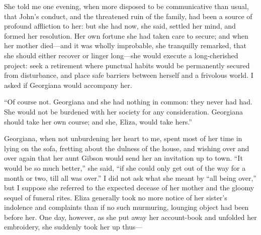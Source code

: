 She told me one evening, when more disposed to be communicative than
usual, that John's conduct, and the threatened ruin of the family, had
been a source of profound affliction to her: but she had now, she said,
settled her mind, and formed her resolution. Her own fortune she had
taken care to secure; and when her mother died---and it was wholly
improbable, she tranquilly remarked, that she should either recover or
linger long---she would execute a long-cherished project: seek a
retirement where punctual habits would be permanently secured from
disturbance, and place safe barriers between herself and a frivolous
world. I asked if Georgiana would accompany her.

\enquote{Of course not. Georgiana and she had nothing in common: they
	never had had. She would not be burdened with her society for any
	consideration. Georgiana should take her own course; and she, Eliza,
	would take hers.}

Georgiana, when not unburdening her heart to me, spent most of her time
in lying on the sofa, fretting about the dulness of the house, and
wishing over and over again that her aunt Gibson would send her an
invitation up to town. \enquote{It would be so much better,} she said,
\enquote{if she could only get out of the way for a month or two, till
	all was over.} I did not ask what she meant by \enquote{all being
	over,} but I suppose she referred to the expected decease of her mother
and the gloomy sequel of funeral rites. Eliza generally took no more
notice of her sister's indolence and complaints than if no such
murmuring, lounging object had been before her. One day, however, as
she put away her account-book and unfolded her embroidery, she suddenly
took her up thus---

